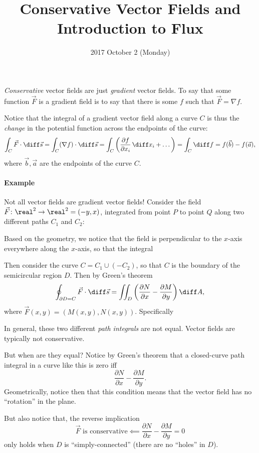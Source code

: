 \documentclass{multi}
\date{2017 October 2 (Monday)}
\title{Conservative Vector Fields and Introduction to Flux}
\begin{document}
\emph{Conservative} vector fields are just \emph{gradient} vector fields. To say
that some function \(\vec F\) is a gradient field is to say that there is some
\(f\) such that \(\vec F = \nabla f\).

Notice that the integral of a gradient vector field along a curve \(C\) is thus
the \emph{change} in the potential function across the endpoints of the curve:
\[
    \int_C \vec F \cdot \diff \vec s = \int_C (\nabla f) \cdot \diff \vec s =
    \int_C \left(\frac{\partial f}{\partial x_i} \, \diff x_i + \dots\right) =
    \int_C \diff f = f(\vec b) - f(\vec a),
\]
where \(\vec b, \vec a\) are the endpoints of the curve \(C\).

\paragraph{Example}

Not all vector fields are gradient vector fields! Consider the field \(\vec
F\colon \real^2 \to \real^2 = (-y, x)\), integrated from point \(P\) to point
\(Q\) along two different paths \(C_1\) and \(C_2\):
\begin{center}
  
\end{center}
Based on the geometry, we notice that the field is perpendicular to the
\(x\)-axis everywhere along the \(x\)-axis, so that the integral

Then consider the curve \(C = C_1 \cup (-C_2)\), so that \(C\) is the boundary
of the semicircular region \(D\). Then by Green's theorem
\[
    \oint_{\partial D = C} \vec F \cdot \diff \vec s = \iint_D
    \left(\frac{\partial N}{\partial x} - \frac{\partial M}{\partial y}\right)
    \diff A,
\]
where \(\vec F(x, y) = (M(x, y), N(x, y))\). Specifically

In general, these two different \emph{path integrals} are not equal. Vector
fields are typically not conservative.

But when are they equal? Notice by Green's theorem that a closed-curve path
integral in a curve like this is zero iff
\[
    \frac{\partial N}{\partial x} - \frac{\partial M}{\partial y}.
\]
Geometrically, notice then that this condition means that the vector field has
no ``rotation'' in the plane.

But also notice that, the reverse implication
\[
    \text{\(\vec F\) is conservative} \impliedby \frac{\partial N}{\partial x} -
    \frac{\partial M}{\partial y} = 0
\]
only holds when \(D\) is ``simply-connected'' (there are no ``holes'' in \(D\)).
\end{document}
